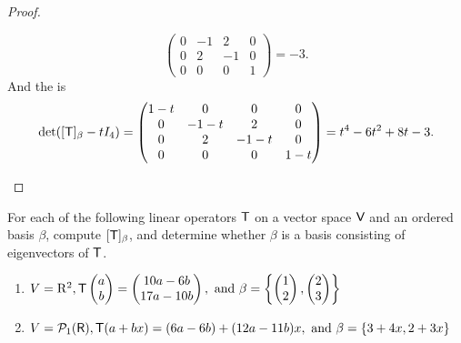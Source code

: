 \begin{proof}
\begin{enumerate}
\[\begin{pmatrix}
        0 & -1 & 2 & 0 \\
        0 & 2 & -1 & 0 \\
        0 & 0 & 0 & 1
    \end{pmatrix} = -3.
\]
And the \CPOLY{} is
\[
    \det([\textsf{T}]_{\beta} - t I_4) = \begin{pmatrix}
        1-t & 0 & 0 & 0 \\
        0 & -1-t & 2 & 0 \\
        0 & 2 & -1-t & 0 \\
        0 & 0 & 0 & 1-t
    \end{pmatrix} = t^4 - 6t^2 + 8t - 3.
\]
\end{enumerate}
\end{proof}

\begin{exercise} \label{exercise 5.1.3}
For each of the following linear operators \(\textsf{T}\) on a vector space \(\textsf{V}\) and an ordered basis \(\beta\), compute \([\textsf{T}]_{\beta}\), and determine whether \(\beta\) is a basis
consisting of eigenvectors of \(\textsf{T}\).

\begin{enumerate}
\item
\(
    V = \mathrm{R}^{2}, \textsf{T}\begin{pmatrix}a \\ b\end{pmatrix}=\begin{pmatrix}10 a-6 b \\ 17 a-10 b\end{pmatrix} , \text{ and } \beta=\left\{\begin{pmatrix}1 \\ 2\end{pmatrix},\begin{pmatrix}2 \\ 3\end{pmatrix}\right\}\)

\item
\(
    V=\mathcal{P}_{1}(\textsf{R}), \textsf{T}(a+b x)=(6 a-6 b)+(12 a-11 b) x ,
    \text{ and } \beta=\{3+4 x, 2+3 x\}
\)


\end{enumerate}
\end{exercise}

